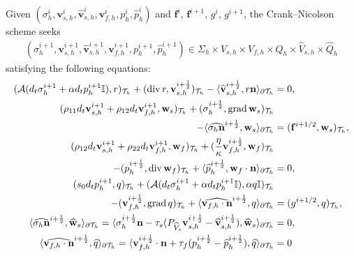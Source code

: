 \documentclass[10pt,a4paper]{amsart}
\newcommand{\Ael}{\mathcal{A}} %
\newcommand{\Id}{\mathbb{I}} %
\newcommand{\Thprod}[2]{( #1, #2 )_{\mathcal{T}_h}}
\newcommand{\divergence}{\mathrm{div}\,}
\newcommand{\grad}{\mathrm{grad}\,}
\newcommand{\pThprod}[2]{\langle #1, #2 \rangle_{\partial \mathcal{T}_{h}}}
\newcommand{\vect}[1]{\mathbf{#1}}
\begin{document}
Given $(\sigma_h^i, \vect{v}_{s,h}^i, \widehat{\vect{v}}_{s,h}^i, \vect{v}_{f,h}^i, p_h^i, \widehat{p}_h^i)$ and $\vect{f}^i$, $\vect{f}^{i+1}$, $g^i$, $g^{i+1}$, the Crank--Nicolson scheme seeks 
%
\begin{align*}
	(\sigma_h^{i+1}, \vect{v}_{s,h}^{i+1}, \widehat{\vect{v}}_{s,h}^{i+1}, \vect{v}_{f,h}^{i+1}, p_h^{i+1}, \widehat{p}_h^{i+1}) \in \Sigma_{h} \times V_{s,h} \times V_{f,h} \times Q_{h} \times \widehat{V}_{s,h}\times \widehat{Q}_{h}
\end{align*}
%
satisfying the following equations:  
%
\begin{subequations}
	\label{eq:fully-discrete-cn-eqs}
	\begin{align}
		\label{eq:fully-discrete-cn-eq1}
		\Thprod{\Ael(d_t \sigma_{h}^{i+1} + \alpha d_t{p}_{h}^{i+1} \Id)}{r} +\Thprod{\divergence r}{\vect{v}_{s,h}^{i+\frac 12}} -\pThprod{\widehat{\vect{v}}_{s,h}^{i+\frac 12}}{r \vect{n}} &= 0 ,
		\\ 
		\label{eq:fully-discrete-cn-eq2}		\Thprod{\rho_{11}d_t{\vect{v}}_{s,h}^{i+1}+\rho_{12}d_t{\vect{v}}_{f,h}^{i+1}}{\vect{w}_{s}} + \Thprod{\sigma_{h}^{i+\frac 12}}{\grad \vect{w}_{s}} &
        \\
        \notag 
        -\pThprod{\widehat{\sigma_{h} \vect{n}}^{i+\frac 12} }{\vect{w}_{s}} 
		&= {\Thprod{\vect{f}^{i+1/2}}{\vect{w}_{s}}}, 
		\\
		\label{eq:fully-discrete-cn-eq3}
		\Thprod{\rho_{12}d_t{\vect{v}}_{s,h}^{i+1}+\rho_{22}d_t{\vect{v}}_{f,h}^{i+1}}{\vect{w}_{f}} + \Thprod{\frac{\eta}{\kappa} \vect{v}_{f,h}^{i+\frac 12}}{\vect{w}_{f}} 
		&
        \\
        \notag 
        - \Thprod{p_{h}^{i+\frac 12} }{\divergence\vect{w}_{f}} +\pThprod{\widehat{p}_{h}^{i+\frac 12}}{\vect{w}_{f}\cdot\vect{n}} &= 0, 
		\\
		\label{eq:fully-discrete-cn-eq4}
		\Thprod{s_{0}d_t{p}_{h}^{i+1}}{q} + \Thprod{\Ael(d_t{\sigma}_{h}^{i+1}+\alpha d_t{p}_{h}^{i+1}\Id)}{\alpha q\Id} &
        \\
        \notag 
        - \Thprod{\vect{v}_{f,h}^{i+\frac 12}}{\grad q} 
		+\pThprod{\widehat{\vect{v}_{f,h}\cdot \vect{n}}^{i+\frac 12} }{q}
		&={\Thprod{g^{i+1/2} }{q}}, 
		\\
		\label{eq:fully-discrete-cn-eq5}
		\pThprod{\widehat{\sigma_h\vect{n}}^{i+\frac 12}  }{\widehat{\vect{w}}_{s}}
		=
		\pThprod{\sigma_h^{i+\frac 12} \vect{n} - \tau_{s} ({P_{\widehat{V}_s}} \vect{v}_{s,h}^{i+\frac 12} - \widehat{\vect{v}}_{s,h}^{i+\frac 12})}{\widehat{\vect{w}}_{s}} &= 0, 
		\\
		\label{eq:fully-discrete-cn-eq6}
		\pThprod{\widehat{\vect{v}_{f,h} \cdot \vect{n}}^{i+\frac 12} }{\widehat{q}}
		=
		\pThprod{\vect{v}_{f,h}^{i+\frac 12}\cdot \vect{n} + \tau_f (p_h^{i+\frac 12} - \widehat{p}_h^{i+\frac 12})}{\widehat{q}} &= 0
	\end{align}
\end{subequations}
\end{document}
